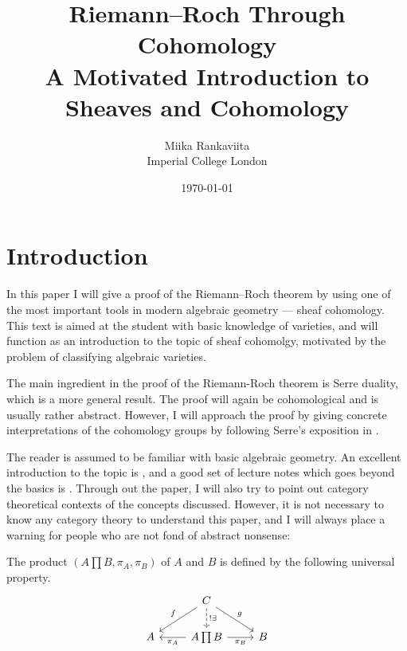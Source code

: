 \documentclass[12pt]{article}
\begin{document}
\title{Riemann--Roch Through Cohomology\\
        \large A Motivated Introduction to Sheaves and Cohomology}
\author{Miika Rankaviita\\Imperial College London}
\date{\today}
\maketitle

\theoremstyle{plain}
\newtheorem{thm}{Theorem}[section]
\newtheorem{cor}{Corollary}[thm]
\newtheorem{prop}[thm]{Proposition}
\newtheorem{lemm}[thm]{Lemma}
\newtheorem*{rem}{Remark}
\theoremstyle{definition}
\newtheorem{defin}[thm]{Definition}
\newtheorem{ex}[thm]{Example}


\section{Introduction}
In this paper I will give a proof of the Riemann--Roch theorem
by using one of the most important tools in modern algebraic geometry ---
sheaf cohomology. This text is aimed at the student with
basic knowledge of varieties, and will function as an introduction
to the topic of sheaf cohomolgy, motivated by the problem of classifying
algebraic varieties.


The main ingredient in the proof of the Riemann-Roch theorem is
Serre duality, which is a more general result. The proof will again
be cohomological and is usually rather abstract. However, I will
approach the proof by giving concrete interpretations of
the cohomology groups by following Serre's exposition in \cite{serre}.

The reader is assumed to be familiar with basic algebraic geometry.
An excellent introduction to the topic is \cite{reid}, and a good set
of lecture notes which goes beyond the basics is \cite{gathmann}.
Through out the paper, I will also try to point out category theoretical
contexts of the concepts discussed. However, it is not necessary to know
any category theory to understand this paper, and I will always place a
warning for people who are not fond of abstract nonsense:

\begin{cat}
  The product $(A\prod B, \pi_{A}, \pi_{B})$ of $A$ and $B$ is defined by the
  following universal property.
  \[
    \begin{tikzcd}
      &C\arrow{ld}[swap]{f}\arrow[dashed]{d}{!\exists}\arrow{rd}{g}&\\
      A&A\prod B\arrow{l}{\pi_{A}}\arrow{r}[swap]{\pi_{B}}&B
    \end{tikzcd}
  \]
\end{cat}
\end{document}
